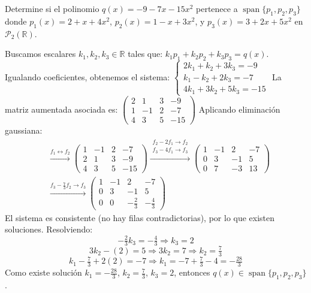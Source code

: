 \begin{example} 
Determine si el polinomio $q(x) = -9 - 7x - 15x^2$ pertenece a $\operatorname{span}\{p_1, p_2, p_3\}$ donde $p_1(x) = 2 + x + 4x^2$, $p_2(x) = 1 - x + 3x^2$, y $p_3(x) = 3 + 2x + 5x^2$ en $\mathcal{P}_2(\mathbb{R})$.

\begin{myproof}
Buscamos escalares $k_1, k_2, k_3 \in \mathbb{R}$ tales que: \(
k_1 p_1 + k_2 p_2 + k_3 p_3 = q(x).\)
Igualando coeficientes, obtenemos el sistema: \(
\begin{cases}
2k_1 + k_2 + 3k_3 = -9 \\
k_1 - k_2 + 2k_3 = -7 \\
4k_1 + 3k_2 + 5k_3 = -15
\end{cases}
\)
La matriz aumentada asociada es: \(
\left(\begin{array}{ccc|c}
2 & 1 & 3 & -9 \\
1 & -1 & 2 & -7 \\
4 & 3 & 5 & -15
\end{array}\right)
\)
Aplicando eliminación gaussiana:
\begin{align*}
&\xrightarrow{f_1 \leftrightarrow f_2}
\left(\begin{array}{ccc|c}
1 & -1 & 2 & -7 \\
2 & 1 & 3 & -9 \\
4 & 3 & 5 & -15
\end{array}\right)
\xrightarrow{\substack{f_2 - 2f_1\to f_2 \\ f_3 - 4f_1\to f_3}}
\left(\begin{array}{ccc|c}
1 & -1 & 2 & -7 \\
0 & 3 & -1 & 5 \\
0 & 7 & -3 & 13
\end{array}\right) \\
&\xrightarrow{f_3 - \frac{7}{3}f_2\to f_3}
\left(\begin{array}{ccc|c}
1 & -1 & 2 & -7 \\
0 & 3 & -1 & 5 \\
0 & 0 & -\frac{2}{3} & -\frac{4}{3}
\end{array}\right)
\end{align*}
El sistema es consistente (no hay filas contradictorias), por lo que existen soluciones. Resolviendo:
\[
-\tfrac{2}{3}k_3 = -\tfrac{4}{3} \Rightarrow k_3 = 2
\]
\[
3k_2 - (2) = 5 \Rightarrow 3k_2 = 7 \Rightarrow k_2 = \tfrac{7}{3}
\]
\[
k_1 - \tfrac{7}{3} + 2(2) = -7 \Rightarrow k_1 = -7 + \tfrac{7}{3} - 4 = -\tfrac{28}{3}
\]
Como existe solución $k_1 = -\frac{28}{3}$, $k_2 = \frac{7}{3}$, $k_3 = 2$, entonces $q(x) \in \operatorname{span}\{p_1, p_2, p_3\}$.
\end{myproof} 
\end{example}

